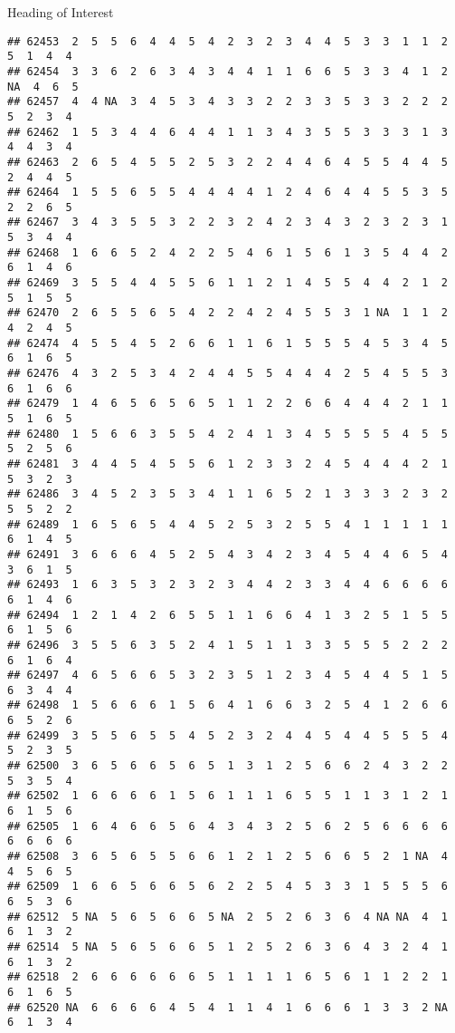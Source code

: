 \documentclass[
  ignorenonframetext,
]{beamer}
\begin{document}
\begin{frame}[fragile]{Heading of Interest}
\begin{verbatim}
## 62453  2  5  5  6  4  4  5  4  2  3  2  3  4  4  5  3  3  1  1  2  5  1  4  4
## 62454  3  3  6  2  6  3  4  3  4  4  1  1  6  6  5  3  3  4  1  2 NA  4  6  5
## 62457  4  4 NA  3  4  5  3  4  3  3  2  2  3  3  5  3  3  2  2  2  5  2  3  4
## 62462  1  5  3  4  4  6  4  4  1  1  3  4  3  5  5  3  3  3  1  3  4  4  3  4
## 62463  2  6  5  4  5  5  2  5  3  2  2  4  4  6  4  5  5  4  4  5  2  4  4  5
## 62464  1  5  5  6  5  5  4  4  4  4  1  2  4  6  4  4  5  5  3  5  2  2  6  5
## 62467  3  4  3  5  5  3  2  2  3  2  4  2  3  4  3  2  3  2  3  1  5  3  4  4
## 62468  1  6  6  5  2  4  2  2  5  4  6  1  5  6  1  3  5  4  4  2  6  1  4  6
## 62469  3  5  5  4  4  5  5  6  1  1  2  1  4  5  5  4  4  2  1  2  5  1  5  5
## 62470  2  6  5  5  6  5  4  2  2  4  2  4  5  5  3  1 NA  1  1  2  4  2  4  5
## 62474  4  5  5  4  5  2  6  6  1  1  6  1  5  5  5  4  5  3  4  5  6  1  6  5
## 62476  4  3  2  5  3  4  2  4  4  5  5  4  4  4  2  5  4  5  5  3  6  1  6  6
## 62479  1  4  6  5  6  5  6  5  1  1  2  2  6  6  4  4  4  2  1  1  5  1  6  5
## 62480  1  5  6  6  3  5  5  4  2  4  1  3  4  5  5  5  5  4  5  5  5  2  5  6
## 62481  3  4  4  5  4  5  5  6  1  2  3  3  2  4  5  4  4  4  2  1  5  3  2  3
## 62486  3  4  5  2  3  5  3  4  1  1  6  5  2  1  3  3  3  2  3  2  5  5  2  2
## 62489  1  6  5  6  5  4  4  5  2  5  3  2  5  5  4  1  1  1  1  1  6  1  4  5
## 62491  3  6  6  6  4  5  2  5  4  3  4  2  3  4  5  4  4  6  5  4  3  6  1  5
## 62493  1  6  3  5  3  2  3  2  3  4  4  2  3  3  4  4  6  6  6  6  6  1  4  6
## 62494  1  2  1  4  2  6  5  5  1  1  6  6  4  1  3  2  5  1  5  5  6  1  5  6
## 62496  3  5  5  6  3  5  2  4  1  5  1  1  3  3  5  5  5  2  2  2  6  1  6  4
## 62497  4  6  5  6  6  5  3  2  3  5  1  2  3  4  5  4  4  5  1  5  6  3  4  4
## 62498  1  5  6  6  6  1  5  6  4  1  6  6  3  2  5  4  1  2  6  6  6  5  2  6
## 62499  3  5  5  6  5  5  4  5  2  3  2  4  4  5  4  4  5  5  5  4  5  2  3  5
## 62500  3  6  5  6  6  5  6  5  1  3  1  2  5  6  6  2  4  3  2  2  5  3  5  4
## 62502  1  6  6  6  6  1  5  6  1  1  1  6  5  5  1  1  3  1  2  1  6  1  5  6
## 62505  1  6  4  6  6  5  6  4  3  4  3  2  5  6  2  5  6  6  6  6  6  6  6  6
## 62508  3  6  5  6  5  5  6  6  1  2  1  2  5  6  6  5  2  1 NA  4  4  5  6  5
## 62509  1  6  6  5  6  6  5  6  2  2  5  4  5  3  3  1  5  5  5  6  6  5  3  6
## 62512  5 NA  5  6  5  6  6  5 NA  2  5  2  6  3  6  4 NA NA  4  1  6  1  3  2
## 62514  5 NA  5  6  5  6  6  5  1  2  5  2  6  3  6  4  3  2  4  1  6  1  3  2
## 62518  2  6  6  6  6  6  6  5  1  1  1  1  6  5  6  1  1  2  2  1  6  1  6  5
## 62520 NA  6  6  6  6  4  5  4  1  1  4  1  6  6  6  1  3  3  2 NA  6  1  3  4

\end{verbatim}
\end{frame}
\end{document}
